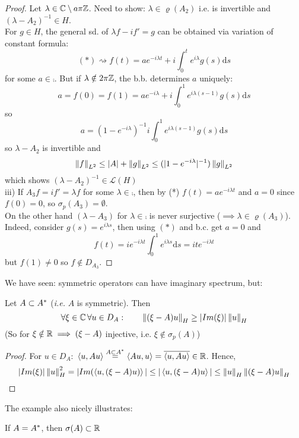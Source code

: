 \documentclass{article}
\begin{document}
\begin{example}
\begin{proof}
		Let $\lambda\in\mathbb{C}\setminus a\pi\mathbb{Z}$.
		Need to show: $\lambda\in\varrho(A_2)$ i.e.  is invertible and $(\lambda-A_2)^{-1}\in{H}$.\\
		For $g\in H$, the general sd. of $\lambda f-if'=g$ can be obtained via variation of constant formula:
		$$
			(*)\rightsquigarrow f(t)=ae^{-i\lambda t}+i \int_0^t e^{i\lambda}g(s)\mathrm{d}s
		$$
		for some $a\in\comp$. But if $\lambda\notin2\pi\mathbb{Z}$, the b.b. determines $a$ uniquely:
		$$
			a=f(0)=f(1)=ae^{-i\lambda}+i\int_0^1e^{i\lambda(s-1)}g(s)\mathrm{d}s$$
		so
		$$
			a=(1-e^{-i\lambda})^{-1}i\int_0^1e^{i\lambda(s-1)}g(s)\mathrm{d}s
		$$
		so $\lambda-A_2$ is invertible and
		$$
        \left\|{f}\right\|_{L^2}\leq |A|+\left\|{g}\right\|_{L^2}\leq(|1-e^{-i\lambda}|^{-1})\left\|{g}\right\|_{L^2}
        $$
		which shows $(\lambda-A_2)^{-1}\in\mathcal{L}(H)$\\
		iii) If $A_3f=if'=\lambda f$ for some $\lambda\in\comp$, then by (*) $f(t)=ae^{-i\lambda t}$ and $a=0$ since $f(0)=0$, so $\sigma_p(A_3)=\emptyset$.\\
		On the other hand $(\lambda-A_3)$ for $\lambda\in\comp$ is never surjective ($\implies \lambda\in\varrho(A_3)$). Indeed, consider $g(s)=e^{i\lambda s}$, then using $(*)$ and b.c. get $a=0$ and
		$$
        f(t)=ie^{-i\lambda t}\int_0^1e^{i\lambda s} \mathrm{d}s=ite^{-i\lambda t}
        $$
		but $f(1)\neq0$ so $f\notin D_{A_3}$.
	\end{proof}
\end{example}
We have seen: symmetric operators can have imaginary spectrum, but:
\begin{lemma}
\label{images of symmetric operators bounded below by imaginary part}

Let $A\subset {A}^*$ (\textit{i.e.} $A$ is symmetric). Then 
 $$
 \forall \xi \in \mathbb{C} \, \forall u\in D_A: \qquad  \left\|{(\xi-A)u}\right\|_H\geq |Im(\xi)|\left\|{u}\right\|_H
  $$
	(So for $\xi\notin\mathbb{R}\implies(\xi-A)$ injective, i.e. $\xi\notin\sigma_p(A)$)
\end{lemma}
\begin{proof}
		For $u\in D_A:$ $\left<{u},{Au}\right>\stackrel{A\subset{A}^*}{=}\left<{Au},{u}\right>=\overline{\left<{u},{Au}\right>}\in\mathbb{R}$. Hence,
		$$
			|Im(\xi)|\left\|{u}\right\|^2_H=|Im(\left<{u},{(\xi-A)u)}\right>|\leq|\left<{u},{(\xi-A)u}\right>|\leq\left\|{u}\right\|_H\left\|{(\xi-A)u}\right\|_H
		$$
\end{proof}
The example also nicely illustrates:
\begin{proposition}
	If $A={A}^*$, then $\sigma(A)\subset \mathbb{R}$
\end{proposition}
\end{document}
